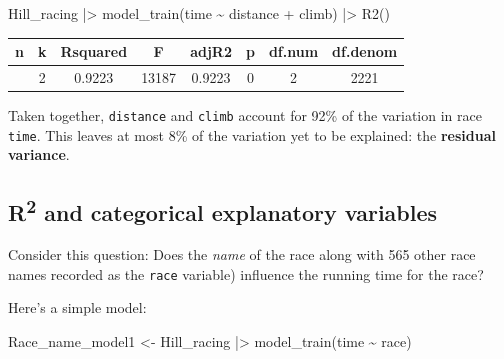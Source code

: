 \documentclass[
  letterpaper,
  DIV=11,
  numbers=noendperiod,
  oneside]{scrartcl}
\newenvironment{Shaded}{\begin{snugshade}}{\end{snugshade}}
\newcommand{\FunctionTok}[1]{\textcolor[rgb]{0.28,0.35,0.67}{#1}}
\newcommand{\NormalTok}[1]{\textcolor[rgb]{0.00,0.23,0.31}{#1}}
\newcommand{\OtherTok}[1]{\textcolor[rgb]{0.00,0.23,0.31}{#1}}
\newcommand{\SpecialCharTok}[1]{\textcolor[rgb]{0.37,0.37,0.37}{#1}}
\begin{document}
\begin{Shaded}
\begin{Highlighting}[]
\NormalTok{Hill\_racing }\SpecialCharTok{|\textgreater{}} \FunctionTok{model\_train}\NormalTok{(time }\SpecialCharTok{\textasciitilde{}}\NormalTok{ distance }\SpecialCharTok{+}\NormalTok{ climb) }\SpecialCharTok{|\textgreater{}} \FunctionTok{R2}\NormalTok{()}
\end{Highlighting}
\end{Shaded}

\begin{longtable}[]{@{}cccccccc@{}}
\toprule\noalign{}
n & k & Rsquared & F & adjR2 & p & df.num & df.denom \\
\midrule\noalign{}
\endhead
\bottomrule\noalign{}
\endlastfoot
2224 & 2 & 0.9223 & 13187 & 0.9223 & 0 & 2 & 2221 \\
\end{longtable}

Taken together, \texttt{distance} and \texttt{climb} account for 92\% of
the variation in race \texttt{time}. This leaves at most 8\% of the
variation yet to be explained: the \textbf{residual variance}.

\subsection{\texorpdfstring{R\textsuperscript{2} and categorical
explanatory
variables}{R2 and categorical explanatory variables}}\label{r2-and-categorical-explanatory-variables}

Consider this question: Does the \emph{name} of the race
{} along with 565
other race names recorded as the \texttt{race} variable) influence the
running time for the race?

Here's a simple model:

\begin{Shaded}
\begin{Highlighting}[]
\NormalTok{Race\_name\_model1 }\OtherTok{\textless{}{-}}\NormalTok{ Hill\_racing }\SpecialCharTok{|\textgreater{}} \FunctionTok{model\_train}\NormalTok{(time }\SpecialCharTok{\textasciitilde{}}\NormalTok{ race) }
\end{Highlighting}
\end{Shaded}
\end{document}
